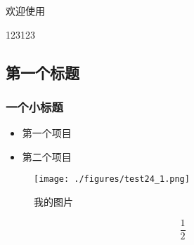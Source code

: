 
欢迎使用

123123

\subsection{第一个标题}
\subsubsection{一个小标题}

\begin{itemize}
\item 第一个项目
\item 第二个项目
\end{itemize}

\begin{figure}[ht]
\centering
\texttt{[image: ./figures/test24\_1.png]}
\caption{我的图片} \label{test24_fig1}
\end{figure}

\begin{equation}
\frac{1}{2}
\end{equation}
